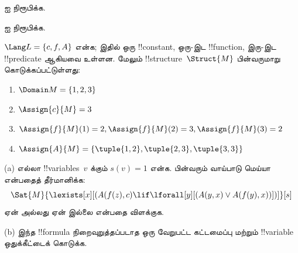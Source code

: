 \documentclass[../../../include/open-logic-section]{subfiles}
\begin{document}

\begin{prob}
   ஐ நிரூபிக்க.
\end{prob}
\tagendprob


\begin{prob}
   ஐ நிரூபிக்க.
\end{prob}
\tagendprob

\begin{prob}
$\Lang L = \{c, f, A\}$ என்க; இதில் ஒரு !!{constant}, ஒரு-இட
!!{function}, இரு-இட !!{predicate} ஆகியவை உள்ளன. மேலும்
!!{structure}~$\Struct{M}$ பின்வருமாறு கொடுக்கப்பட்டுள்ளது:
\begin{enumerate}
\item $\Domain M = \{1, 2, 3\}$
\item $\Assign{c}{M} = 3$
\item $\Assign{f}{M}(1) = 2, \Assign{f}{M}(2) = 3, \Assign{f}{M}(3) = 2$
\item $\Assign{A}{M} = \{\tuple{1, 2}, \tuple{2, 3}, \tuple{3, 3}\}$
\end{enumerate}
(a) எல்லா !!{variable}s~$v$ க்கும் $s(v) = 1$ என்க. பின்வரும்
வாய்பாடு மெய்யா என்பதைத் தீர்மானிக்க:
\[
\Sat{M}{\lexists[x][(A(f(z), c) \lif \lforall[y][(A(y, x) \lor A(f(y),
      x))])]}[s]
\]
ஏன் அல்லது ஏன் இல்லை என்பதை விளக்குக.

(b) இந்த !!{formula} நிறைவுறுத்தப்படாத ஒரு வேறுபட்ட
கட்டமைப்பு மற்றும் !!{variable} ஒதுக்கீட்டைக் கொடுக்க.
\end{prob}
\end{document}
